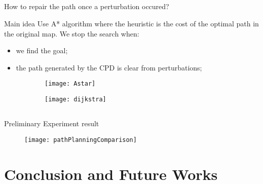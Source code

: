 \documentclass[utf8, a4paper]{beamer}
\begin{document}
\subsection{}
\begin{frame}{How to repair the path once a perturbation occured?}
	\begin{block}{Main idea}
		Use A* algorithm where the heuristic is the cost of the optimal path in the original map. We stop the search when:
		\begin{itemize}
			\item we find the goal;
			\item the path generated by the CPD is clear from perturbations;
		\end{itemize}
	\end{block}
	
	\begin{figure}
		\centering
		\begin{subfigure}{0.45\textwidth}
			\texttt{[image: Astar]}
		\end{subfigure}\hfill%
		\begin{subfigure}{0.45\textwidth}
			\texttt{[image: dijkstra]}
		\end{subfigure}
	\end{figure}
\end{frame}

\subsection{}
\begin{frame}{Preliminary Experiment result}
	\begin{figure}
		\texttt{[image: pathPlanningComparison]}
	\end{figure}
\end{frame}

\section{Conclusion and Future Works}
\end{document}
